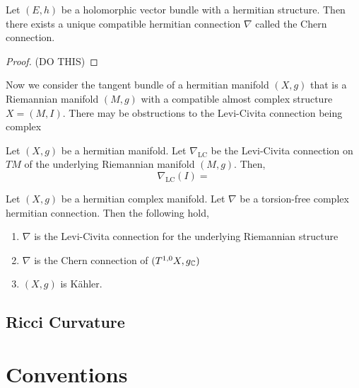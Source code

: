 \documentclass[12pt]{article}
\begin{document}
\begin{prop}
Let $(E, h)$ be a holomorphic vector bundle with a hermitian structure. Then there exists a unique compatible hermitian connection $\nabla$ called the Chern connection.
\end{prop}

\begin{proof}
(DO THIS)
\end{proof}

\begin{rmk}
Now we consider the tangent bundle of a hermitian manifold $(X, g)$ that is a Riemannian manifold $(M, g)$ with a compatible almost complex structure $X = (M, I)$. There may be obstructions to the Levi-Civita connection being complex 
\end{rmk}

\begin{prop}

\end{prop}

\begin{prop}
Let $(X, g)$ be a hermitian manifold. Let $\nabla_{\mathrm{LC}}$ be the Levi-Civita connection on $TM$ of the underlying Riemannian manifold $(M, g)$. Then,
\[ \nabla_{\text{LC}}(I) = \]
\end{prop}

\begin{prop}
Let $(X, g)$ be a hermitian complex manifold. Let $\nabla$ be a torsion-free complex hermitian connection. Then the following hold,
\begin{enumerate}
\item $\nabla$ is the Levi-Civita connection for the underlying Riemannian structure
\item $\nabla$ is the Chern connection of $(T^{1,0} X, g_{\mathbb{C}})$ 
\item $(X, g)$ is K\"{a}hler.
\end{enumerate}
\end{prop}


\subsection{Ricci Curvature}

\section{Conventions}
\end{document}
